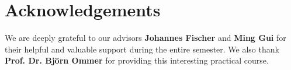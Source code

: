 \section*{Acknowledgements}

We are deeply grateful to our advisors \textbf{Johannes Fischer} and \textbf{Ming Gui} for their helpful and valuable support during the entire semester. 
We also thank \textbf{Prof. Dr. Björn Ommer} for providing this interesting practical course.